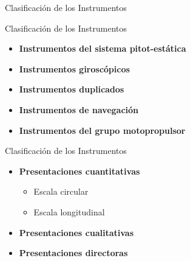 \documentclass[10pt]{beamer}
\begin{document}
\begin{frame}{Clasificaci\'on de los Instrumentos}
\end{frame}

\begin{frame}{Clasificaci\'on de los Instrumentos}

  \begin{itemize}
  \item {\bf Instrumentos del sistema pitot-est\'atica}
  \item {\bf Instrumentos girosc\'opicos}
  \item {\bf Instrumentos duplicados}
  \item {\bf Instrumentos de navegaci\'on}
  \item {\bf Instrumentos del grupo motopropulsor}
  \end{itemize}

\end{frame}

\begin{frame}{Clasificaci\'on de los Instrumentos}

  \begin{itemize}
  \item {\bf Presentaciones cuantitativas}
    \begin{itemize}
      \item Escala circular
       \item Escala longitudinal
    \end{itemize}
  \item {\bf Presentaciones cualitativas}
  \item {\bf Presentaciones directoras}
  \end{itemize}

\end{frame}
\end{document}
